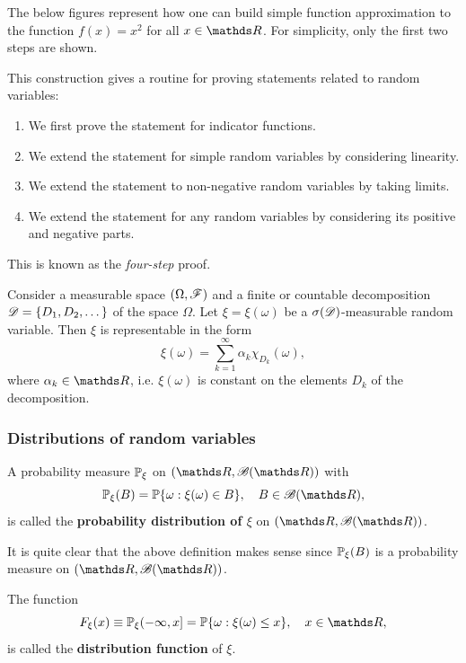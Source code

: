 The below figures represent how one can build simple function approximation to the function $f(x) = x^2$ for all $x \in \R$. For simplicity, only the first two steps are shown.


This construction gives a routine for proving statements related to random variables: 
\begin{enumerate}
    \item We first prove the statement for indicator functions.
    \item We extend the statement for simple random variables by considering linearity.
    \item We extend the statement to non-negative random variables by taking limits.
    \item We extend the statement for any random variables by considering its positive and negative parts.
\end{enumerate}
This is known as the \textit{four-step} proof.
\begin{lemma}
Consider a measurable space $(\Omega, \mathcal{F})$ and a finite or countable decomposition $\mathcal{D} = \{ D_1, D_2, \dots \}$ of the space $\Omega$. Let $\xi = \xi(\omega)$ be a $\sigma(\mathcal{D})$-measurable random variable. Then $\xi$ is representable in the form
\begin{equation*}
    \xi(\omega) = \sum_{k=1}^\infty \alpha_k \chi_{D_k}(\omega), 
\end{equation*}
where $\alpha_k \in \R$, i.e. $\xi(\omega)$ is constant on the elements $D_k$ of the decomposition.
\end{lemma}
\subsubsection{Distributions of random variables}

\begin{definition}
A probability measure $\mathbb{P}_\xi$ on $(\R, \B(\R))$ with 
\begin{equation*}
    \p_\xi(B) = \p \{ \omega: \xi(\omega) \in B \}, \quad B \in \B(\R),
\end{equation*}
is called the \textbf{probability distribution of $\xi$} on $(\R, \B(\R))$.
\end{definition}

It is quite clear that the above definition makes sense since $\mathbb{P}_\xi(B)$ is a probability measure on $(\R, \B(\R))$.

\begin{definition}
The function
\begin{equation*}
    F_\xi (x) \equiv \p_\xi(-\infty,x]= \p \{ \omega: \xi(\omega) \le x \}, \quad x\in \R,
\end{equation*}
is called the \textbf{distribution function} of $\xi$.
\end{definition}

